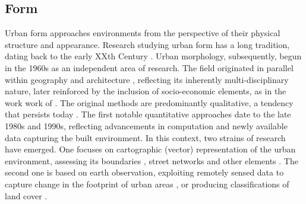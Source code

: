 \subsection{Form}
\label{sec:lit_form}

Urban form approaches environments from the perspective of their physical structure and appearance.
Research studying urban form has a long tradition, dating back to the early
XXth Century \citep{geddes1915cities,
trewartha1934japanese}. Urban morphology, subsequently, begun in the 1960s as an independent area of
research. The field originated in parallel within
geography \citep{conzen1960alnwick} and architecture
\citep{muratori1959studi}, reflecting its inherently multi-disciplinary
nature, later reinforced by the inclusion of socio-economic
elements, as in the work work of \cite{panerai1997formes}. The original methods are
predominantly qualitative, a tendency that persists today \citep{dibble2016urban}.
The first notable quantitative approaches date to the late 1980s and 1990s,
reflecting advancements in computation and newly available data capturing the
built environment. In this context, two strains of research have emerged. One
focuses on cartographic (vector) representation of the urban environment, assessing its
boundaries \citep{batty1987}, street networks \citep{hillier1996, porta2006}
and other elements \citep{pivo1993taxonomy}. The second one is based on earth
observation, exploiting remotely sensed data to capture change in the
footprint of urban areas \citep{howarth1983landsat}, or producing
classifications of land cover \citep{europeanenvironmentagency1990}. 

